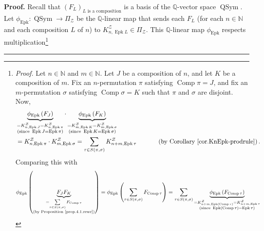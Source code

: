 \documentclass[numbers=enddot,12pt,final,onecolumn,notitlepage]{scrartcl}%
\theoremstyle{definition}
\newenvironment{proof}[1][Proof]{\noindent\textbf{#1.} }{\ \rule{0.5em}{0.5em}}
\newenvironment{verlong}{}{}
\let\sumnonlimits\sum
\renewcommand{\sum}{\sumnonlimits\limits}
\begin{document}
\begin{verlong}
\begin{proof}
Recall that $\left(  F_{L}\right)  _{L\text{ is a composition}}$ is a basis of
the $\mathbb{Q}$-vector space $\operatorname*{QSym}$. Let $\phi
_{\operatorname{Epk}}:\operatorname*{QSym}\rightarrow\Pi_{\mathcal{Z}}$ be
the $\mathbb{Q}$-linear map that sends each $F_{L}$ (for each $n\in\mathbb{N}$
and each composition $L$ of $n$) to $K_{n,\operatorname{Epk}L}^{\mathcal{Z}%
}\in\Pi_{\mathcal{Z}}$. This $\mathbb{Q}$-linear map $\phi
_{\operatorname{Epk}}$ respects multiplication\footnote{\textit{Proof.} Let
$n\in\mathbb{N}$ and $m\in\mathbb{N}$. Let $J$ be a composition of $n$, and
let $K$ be a composition of $m$. Fix an $n$-permutation $\pi$ satisfying
$\operatorname*{Comp}\pi=J$, and fix an $m$-permutation $\sigma$ satisfying
$\operatorname*{Comp}\sigma=K$ such that $\pi$ and $\sigma$ are disjoint.
Now,
\begin{align*}
&  \underbrace{\phi_{\operatorname{Epk}}\left(  F_{J}\right)  }%
_{\substack{=K_{n,\operatorname{Epk}J}^{\mathcal{Z}}
=K_{n,\operatorname{Epk}\pi}^{\mathcal{Z}}\\
\text{(since }\operatorname{Epk}J=\operatorname{Epk} \pi\text{)}}}
\cdot\underbrace{\phi_{\operatorname{Epk}}\left(  F_{K}\right)
}_{\substack{=K_{m,\operatorname{Epk}K}^{\mathcal{Z}}%
=K_{m,\operatorname{Epk}\sigma}^{\mathcal{Z}}\\\text{(since }%
\operatorname{Epk}K=\operatorname{Epk}\sigma\text{)}}}\\
&  =K_{n,\operatorname{Epk}\pi}^{\mathcal{Z}}\cdot
K_{m,\operatorname{Epk}\sigma}^{\mathcal{Z}}
=\sum_{\tau\in S\left(  \pi,\sigma\right)  }%
K_{n+m,\operatorname{Epk}\tau}^{\mathcal{Z}}\ \ \ \ \ \ \ \ \ \ \left(
\text{by Corollary \ref{cor.KnEpk-prodrule}}\right)  .
\end{align*}
Comparing this with%
\begin{align*}
\phi_{\operatorname{Epk}}\left(  \underbrace{F_{J}F_{K}}_{\substack{=\sum
_{\tau\in S\left(  \pi,\sigma\right)  }F_{\operatorname*{Comp}\tau}\\\text{(by
Proposition~\ref{prop.4.1.rewr})}}}\right)   &  =\phi_{\operatorname{Epk}}
\left(  \sum_{\tau\in S\left(  \pi,\sigma\right)  }F_{\operatorname*{Comp}
\tau}\right)  =\sum_{\tau\in S\left(  \pi,\sigma\right)  }\underbrace{\phi
_{\operatorname{Epk}}\left(  F_{\operatorname*{Comp}\tau}\right)
}_{\substack{=K_{n+m,\operatorname{Epk}\left(  \operatorname*{Comp}%
\tau\right)  }^{\mathcal{Z}}=K_{n+m,\operatorname{Epk}\tau}^{\mathcal{Z}%
}\\\text{(since }\operatorname{Epk}\left(  \operatorname*{Comp}\tau\right)
=\operatorname{Epk}\tau\text{)}}}\\

\end{align*}}
\end{proof}
\end{verlong}
\end{document}
